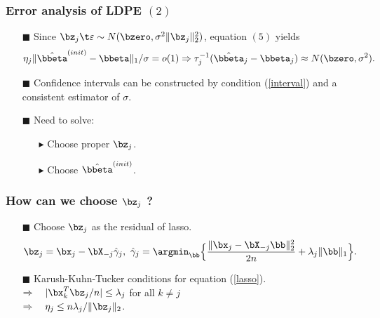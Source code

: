 \begin{frame}
\frametitle{Error analysis of LDPE $(2)$}
\begin{itemize}

\item[$\blacksquare$] Since $\bz_{j} \t \varepsilon \sim N(\bzero, \sigma^{2} \|\bz_{j}\|^{2}_{2})$, equation $(5)$ yields
\begin{equation}
\label{interval}
\eta_{j}\|\hat{\bbeta}^{(init)}-\bbeta\|_{1}/\sigma=o(1)\Rightarrow \tau^{-1}_{j}(\hat{\bbeta}_{j}-\bbeta_{j})\approx N(\bzero,\sigma^{2}).
\end{equation}
\item[$\blacksquare$] Confidence intervals can be constructed by condition (\ref{interval}) and a consistent estimator of $\sigma$.
\item[$\blacksquare$] Need to solve:
  \begin{itemize}
  \item[$\blacktriangleright$] Choose proper $\bz_{j}$.
  \item[$\blacktriangleright$] Choose $\hat{\bbeta}^{(init)}$.
  \end{itemize}

\end{itemize}
\end{frame}

\begin{frame}
\frametitle{How can we choose $\bz_{j}$ ?}
\begin{itemize}

\item[$\blacksquare$] Choose $\bz_{j}$ as the residual of lasso.
\small{
\begin{equation}
\label{lasso}
\bz_j = \bx_j - \bX_{-j} \hat{\gamma}_j,\
\hat{\gamma}_j = \argmin_{\bb}\Big\{\frac{\|\bx_j-\bX_{-j}\bb\|_2^2}{2n}+\lambda_j \|\bb\|_1\Big\}.
\end{equation}
}
\item[$\blacksquare$] Karush-Kuhn-Tucker conditions for equation (\ref{lasso}). \\
                      $\Rightarrow \quad |\bx_k^T\bz_j/n|\le\lambda_{j}$ for all $k \neq j$ \\
                      $\Rightarrow \quad \eta_j\le n\lambda_j/\|\bz_j\|_2$.

\end{itemize}


\end{frame}


